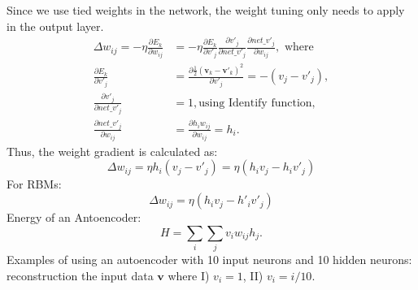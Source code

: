 \documentclass{article}
\begin{document}
Since we use tied weights in the network, the weight tuning only needs to apply in the output layer.
\begin{equation}
\begin{aligned}
\Delta w_{ij} = -\eta \frac{\partial E_k}{\partial w_{ij}} &= -\eta \frac{\partial E_k}{\partial v'_j} \frac{\partial v'_j}{\partial net\_v'_j} \frac{\partial net\_v'_j}{\partial w_{ij}}, \textrm{ where} \\
\frac{\partial E_k}{\partial v'_j} &= \frac{\partial \frac{1}{2}(\mathbf{v}_k - \mathbf{v'}_k)^2}{\partial v'_j}= -(v_j - v'_j), \\
\frac{\partial v'_j}{\partial net\_v'_j} &= 1, \textrm{using Identify function,}\\
\frac{\partial net\_v'_j}{\partial w_{ij}} &= \frac{\partial h_i w_{ij}}{\partial w_{ij}} = h_i.
\end{aligned}
\end{equation}
Thus, the weight gradient is calculated as:
\begin{equation}
\Delta w_{ij} = \eta h_i(v_j - v'_j) = \eta (h_i v_j - h_i v'_j)
\end{equation}
For RBMs:
\begin{equation}
\Delta w_{ij} = \eta (h_i v_j - h'_i v'_j)
\end{equation}
Energy of an Antoencoder:
\begin{equation}
H = \sum_{i}\sum_{j} v_i w_{ij} h_j.
\end{equation}
Examples of using an autoencoder with 10 input neurons and 10 hidden neurons: reconstruction the input data $\mathbf{v}$ where I) $v_i = 1$, II) $v_i = i/10$.
\end{document}
